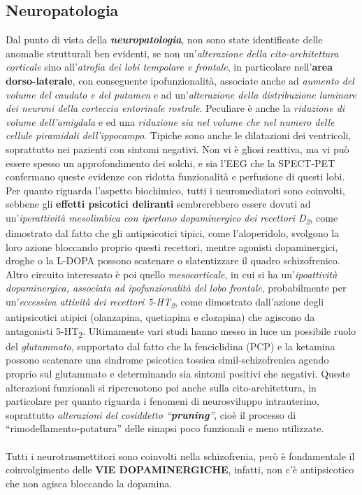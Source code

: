 \subsection{Neuropatologia}
Dal punto di vista della \textbf{\emph{neuropatologia}}, non sono state
identificate delle anomalie strutturali ben evidenti, se non
un'\emph{alterazione della cito-architettura corticale} sino
all'\emph{atrofia dei lobi tempolare e frontale}, in particolare
nell'\textbf{area dorso-laterale}, con conseguente ipofunzionalità,
associate anche ad \emph{aumento del volume del caudato e del putamen} e
ad un'\emph{alterazione della distribuzione laminare dei neuroni della
corteccia entorinale rostrale}. Peculiare è anche la \emph{riduzione di
volume dell'amigdala} e ed una \emph{riduzione sia nel volume che nel
numero delle cellule piramidali dell'ippocampo}. Tipiche sono anche le
dilatazioni dei ventricoli, soprattutto nei pazienti con sintomi
negativi. Non vi è gliosi reattiva, ma vi può essere spesso un
approfondimento dei solchi, e sia l'EEG che la SPECT-PET confermano
queste evidenze con ridotta funzionalità e perfusione di questi lobi.
Per quanto riguarda l'aspetto biochimico, tutti i neuromediatori sono
coinvolti, sebbene gli \textbf{effetti psicotici deliranti}
sembrerebbero essere dovuti ad un'\emph{iperattività mesolimbica con
ipertono dopaminergico dei recettori D\textsubscript{2}}, come
dimostrato dal fatto che gli antipsicotici tipici, come l'aloperidolo,
svolgono la loro azione bloccando proprio questi recettori, mentre
agonisti dopaminergici, droghe o la L-DOPA possono scatenare o
slatentizzare il quadro schizofrenico. Altro circuito interessato è poi
quello \emph{mesocorticale}, in cui si ha un'\emph{ipoattività
dopaminergica, associata ad ipofunzionalità del lobo frontale},
probabilmente per un'\emph{eccessiva attività dei recettori
5-HT\textsubscript{2}}, come dimostrato dall'azione degli antipsicotici
atipici (olanzapina, quetiapina e clozapina) che agiscono da antagonisti
5-HT\textsubscript{2}. Ultimamente vari studi hanno messo in luce un
possibile ruolo del \emph{glutammato}, supportato dal fatto che la
fenciclidina (PCP) e la ketamina possono scatenare una sindrome
psicotica tossica simil-schizofrenica agendo proprio sul glutammato e
determinando sia sintomi positivi che negativi. Queste alterazioni
funzionali si ripercuotono poi anche sulla cito-architettura, in
particolare per quanto riguarda i fenomeni di neurosviluppo
intrauterino, soprattutto \emph{alterazioni del cosiddetto
``\textbf{pruning}''}, cioè il processo di ``rimodellamento-potatura''
delle sinapsi poco funzionali e meno utilizzate.
\\\\
Tutti i neurotrasmettitori sono coinvolti nella schizofrenia, però è
fondamentale il coinvolgimento delle \textbf{VIE DOPAMINERGICHE},
infatti, non c'è antipsicotico che non agisca bloccando la dopamina.

